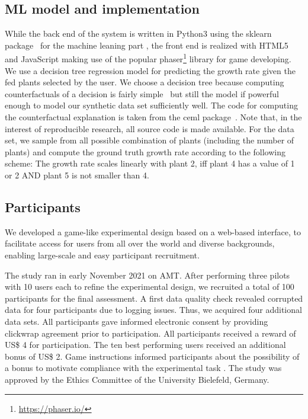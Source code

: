\subsection{ML model and implementation}
While the back end of the system is written in Python3 using the sklearn package~\citep{scikit-learn} for the machine leaning part , the front end is realized with HTML5 and JavaScript making use of the popular phaser\footnote{\url{https://phaser.io/}} library for game developing.
We use a decision tree regression model for predicting the growth rate given the fed plants selected by the user. We choose a decision tree because computing counterfactuals of a decision is fairly simple~\citep{artelt_counterfactuals_survey_2019} but still the model if powerful enough to model our synthetic data set sufficiently well.
The code for computing the counterfactual explanation is taken from the ceml package~\citep{ceml}.
Note that, in the interest of reproducible research, all source code is made available.
For the data set, we sample from all possible combination of plants (including the number of plants) and compute the ground truth growth rate according to the following scheme:
The growth rate scales linearly with plant 2, iff plant 4 has a value of 1 or 2 AND plant 5 is not smaller than 4.


\subsection{Participants}

\textcolor{ACMDarkBlue}{
We developed a game-like experimental design based on a web-based interface, to facilitate access for users from all over the world and diverse backgrounds, enabling large-scale and easy participant recruitment.
}

The study ran in early November 2021 on \gls{AMT}.
After performing three pilots with 10 users each to refine the experimental design, we recruited a total of 100 participants for the final assessment. %
A first data quality check revealed corrupted data for four participants due to logging issues. Thus, we acquired four additional data sets. 
All participants gave informed electronic consent by providing clickwrap agreement prior to participation.
All participants received a reward of US\$ 4 for participation. 
The ten best performing users received an additional bonus of US\$ 2. 
Game instructions informed participants about the possibility of a bonus to motivate compliance with the experimental task \citep{bansal_updates_2019}.
The study was approved by the Ethics Committee of the University Bielefeld, Germany.

